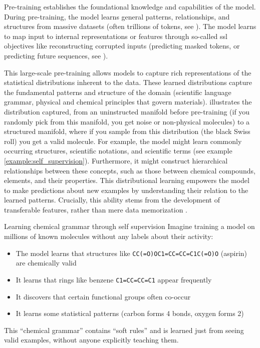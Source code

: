 Pre-training establishes the foundational knowledge and capabilities of the model. 
During pre-training, the model learns general patterns, relationships, and structures from massive datasets (often trillions of tokens, see ). 
The model learns to map input to internal representations or features through so-called \gls{ssl} objectives like reconstructing corrupted inputs (predicting masked tokens, or predicting future sequences, see ). 

This large-scale pre-training allows models to capture rich representations of the statistical distributions inherent to the data.  These learned distributions capture the fundamental patterns and structure of the domain (scientific language grammar, physical and chemical principles that govern materials).  illustrates the distribution captured, from an uninstructed manifold before pre-training (if you randomly pick from this manifold, you get noise or non-physical molecules) to a structured manifold, where if you sample from this distribution (the black Swiss roll) you get a valid molecule.
For example, the model might learn commonly occurring structures, scientific notations, and scientific terms (see example \ref{example:self_supervision}). 
Furthermore, it might construct hierarchical relationships between these concepts, such as those between chemical compounds, elements, and their properties.  
This distributional learning empowers the model to make predictions about new examples by understanding their relation to the learned patterns. Crucially, this ability stems from the development of transferable features, rather than mere data memorization \autocite{brown2020language}. 


\begin{examplebox}[label={example:self_supervision}]{Learning chemical grammar through self supervision}
    Imagine training a model on millions of known molecules without any labels about their activity:

\begin{itemize}
    \item The model learns that structures like \texttt{CC(=O)OC1=CC=CC=C1C(=O)O} (aspirin) are chemically valid
    \item It learns that rings like benzene \texttt{C1=CC=CC=C1} appear frequently
    \item It discovers that certain functional groups often co-occur
    \item It learns some statistical patterns (carbon forms 4 bonds, oxygen forms 2)
\end{itemize}
This \enquote{chemical grammar} contains \enquote{soft rules} and is learned just from seeing valid examples, without anyone explicitly teaching them.
\end{examplebox}


